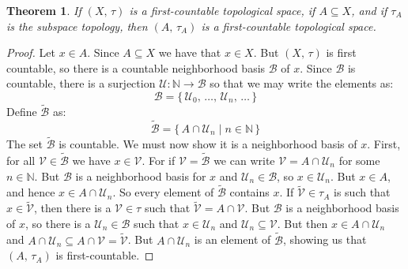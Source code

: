 \documentclass{article}
\theoremstyle{plain}
\newtheorem{theorem}{Theorem}[section]
\theoremstyle{normal}
\begin{document}
        \begin{theorem}
            If $(X,\,\tau)$ is a first-countable topological space, if
            $A\subseteq{X}$, and if $\tau_{A}$ is the subspace topology, then
            $(A,\,\tau_{A})$ is a first-countable topological space.
        \end{theorem}
        \begin{proof}
            Let $x\in{A}$. Since $A\subseteq{X}$ we have that $x\in{X}$. But
            $(X,\,\tau)$ is first countable, so there is a countable
            neighborhood basis $\mathcal{B}$ of $x$. Since $\mathcal{B}$ is
            countable, there is a surjection
            $\mathcal{U}:\mathbb{N}\rightarrow\mathcal{B}$ so that we may write
            the elements as:
            \begin{equation}
                \mathcal{B}=
                \{\,\mathcal{U}_{0},\,\dots,\,\mathcal{U}_{n},\,\dots\,\}
            \end{equation}
            Define $\tilde{\mathcal{B}}$ as:
            \begin{equation}
                \tilde{\mathcal{B}}
                =\{\,A\cap\mathcal{U}_{n}\;|\;n\in\mathbb{N}\,\}
            \end{equation}
            The set $\tilde{\mathcal{B}}$ is countable. We must now show it is
            a neighborhood basis of $x$. First, for all
            $\mathcal{V}\in\tilde{\mathcal{B}}$ we have $x\in\mathcal{V}$.
            For if $\mathcal{V}=\tilde{\mathcal{B}}$ we can write
            $\mathcal{V}=A\cap\mathcal{U}_{n}$ for some $n\in\mathbb{N}$. But
            $\mathcal{B}$ is a neighborhood basis for $x$ and
            $\mathcal{U}_{n}\in\mathcal{B}$, so $x\in\mathcal{U}_{n}$. But
            $x\in{A}$, and hence $x\in{A}\cap\mathcal{U}_{n}$. So every element
            of $\tilde{\mathcal{B}}$ contains $x$. If
            $\tilde{\mathcal{V}}\in\tau_{A}$ is such that
            $x\in\tilde{\mathcal{V}}$,
            then there is a $\mathcal{V}\in\tau$ such that
            $\tilde{\mathcal{V}}=A\cap\mathcal{V}$. But $\mathcal{B}$ is a
            neighborhood basis of $x$, so there is a
            $\mathcal{U}_{n}\in\mathcal{B}$ such that
            $x\in\mathcal{U}_{n}$ and $\mathcal{U}_{n}\subseteq\mathcal{V}$.
            But then $x\in{A}\cap\mathcal{U}_{n}$ and
            $A\cap\mathcal{U}_{n}\subseteq{A}\cap\mathcal{V}=\tilde{\mathcal{V}}$.
            But $A\cap\mathcal{U}_{n}$ is an element of $\tilde{\mathcal{B}}$,
            showing us that $(A,\,\tau_{A})$ is first-countable.
        \end{proof}
\end{document}
